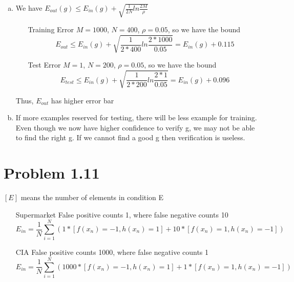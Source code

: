 \documentclass{article}
\def\math#1{$#1$}
\begin{document}
\begin{enumerate}[a)]
    \item We have \math{E_{out}(g) \leq E_{in}(g) + \sqrt{\frac{1}{2N}ln\frac{2M}{\rho}}}
        \begin{itemize}
            \item [Training Error] \math{M = 1000}, \math{N = 400}, \math{\rho = 0.05}, so we have the bound 
                \begin{equation}
                    E_{out} \leq E_{in}(g) + \sqrt{\frac{1}{2 * 400}ln\frac{2 * 1000}{0.05}} = E_{in}(g) + 0.115
                \end{equation}
            \item [Test Error] \math{M = 1}, \math{N = 200}, \math{\rho = 0.05}, so we have the bound 
                \begin{equation}
                    E_{test} \leq E_{in}(g) + \sqrt{\frac{1}{2 * 200}ln\frac{2 * 1}{0.05}} = E_{in}(g) + 0.096
                \end{equation}
        \end{itemize}
        Thus, \math{E_{out}} has higher error bar
    \item If more examples reserved for testing, there will be less example for training. Even though we now have higher confidence to verify g, we may not be able to find the right g. If we cannot find a good g then verification is useless.
\end{enumerate}

\section{Problem 1.11}

\math{[E]} means the number of elements in condition E

\begin{itemize}
    \item [Supermarket] False positive counts 1, where false negative counts 10
        \begin{equation}
            E_{in} = \frac{1}{N} \sum_{i = 1}^{N} (1 * [f(x_n) = -1, h(x_n) = 1] + 10 * [f(x_n) = 1, h(x_n) = -1])
        \end{equation}
    \item [CIA] False positive counts 1000, where false negative counts 1
        \begin{equation}
            E_{in} = \frac{1}{N} \sum_{i = 1}^{N} (1000 * [f(x_n) = -1, h(x_n) = 1] + 1 * [f(x_n) = 1, h(x_n) = -1])
        \end{equation}
\end{itemize}
\end{document}
